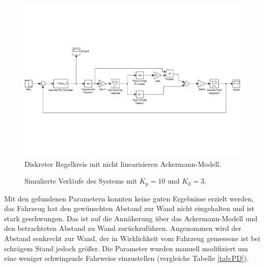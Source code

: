 \begin{figure}[h]
	\centering
	\includegraphics[width=0.9\linewidth,trim=0cm 6cm 0cm 6cm, clip]{pics/system.pdf}
	\caption{Diskreter Regelkreis mit nicht linearisieren Ackermann-Modell.}
	\label{fig:regelkreis}
\end{figure}
\begin{figure}
	\centering
	\caption{Simulierte Verl\"aufe des Systems mit $K_\text{p}=10$ und $K_\text{d}=3$.}
	\label{fig:Simulink}
\end{figure}

Mit den gefundenen Parametern konnten keine guten Ergebnisse erzielt werden, das Fahrzeug hat den gew\"unschten Abstand zur Wand nicht eingehalten und ist stark geschwungen. Das ist auf die Ann\"aherung \"uber das Ackermann-Modell und den betrachteten Abstand zu Wand zur\"uckzuf\"uhren. Angenommen wird der Abstand senkrecht zur Wand, der in Wirklichkeit vom Fahrzeug gemessene ist bei schr\"agem Stand jedoch gr\"o\ss{}er. Die Parameter wurden manuell modifiziert um eine weniger schwingende Fahrweise einzustellen (vergleiche Tabelle \ref{tab:PD}).

